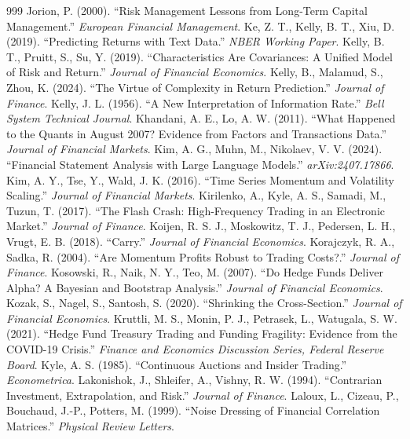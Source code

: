 \begin{thebibliography}{999}
 Jorion, P. (2000). ``Risk Management Lessons from Long-Term Capital Management.'' \textit{European Financial Management}.
 Ke, Z. T., Kelly, B. T., Xiu, D. (2019). ``Predicting Returns with Text Data.'' \textit{NBER Working Paper}.
 Kelly, B. T., Pruitt, S., Su, Y. (2019). ``Characteristics Are Covariances: A Unified Model of Risk and Return.'' \textit{Journal of Financial Economics}.
 Kelly, B., Malamud, S., Zhou, K. (2024). ``The Virtue of Complexity in Return Prediction.'' \textit{Journal of Finance}.
 Kelly, J. L. (1956). ``A New Interpretation of Information Rate.'' \textit{Bell System Technical Journal}.
 Khandani, A. E., Lo, A. W. (2011). ``What Happened to the Quants in August 2007? Evidence from Factors and Transactions Data.'' \textit{Journal of Financial Markets}.
 Kim, A. G., Muhn, M., Nikolaev, V. V. (2024). ``Financial Statement Analysis with Large Language Models.'' \textit{arXiv:2407.17866}.
 Kim, A. Y., Tse, Y., Wald, J. K. (2016). ``Time Series Momentum and Volatility Scaling.'' \textit{Journal of Financial Markets}.
 Kirilenko, A., Kyle, A. S., Samadi, M., Tuzun, T. (2017). ``The Flash Crash: High-Frequency Trading in an Electronic Market.'' \textit{Journal of Finance}.
 Koijen, R. S. J., Moskowitz, T. J., Pedersen, L. H., Vrugt, E. B. (2018). ``Carry.'' \textit{Journal of Financial Economics}.
 Korajczyk, R. A., Sadka, R. (2004). ``Are Momentum Profits Robust to Trading Costs?.'' \textit{Journal of Finance}.
 Kosowski, R., Naik, N. Y., Teo, M. (2007). ``Do Hedge Funds Deliver Alpha? A Bayesian and Bootstrap Analysis.'' \textit{Journal of Financial Economics}.
 Kozak, S., Nagel, S., Santosh, S. (2020). ``Shrinking the Cross-Section.'' \textit{Journal of Financial Economics}.
 Kruttli, M. S., Monin, P. J., Petrasek, L., Watugala, S. W. (2021). ``Hedge Fund Treasury Trading and Funding Fragility: Evidence from the COVID-19 Crisis.'' \textit{Finance and Economics Discussion Series, Federal Reserve Board}.
 Kyle, A. S. (1985). ``Continuous Auctions and Insider Trading.'' \textit{Econometrica}.
 Lakonishok, J., Shleifer, A., Vishny, R. W. (1994). ``Contrarian Investment, Extrapolation, and Risk.'' \textit{Journal of Finance}.
 Laloux, L., Cizeau, P., Bouchaud, J.-P., Potters, M. (1999). ``Noise Dressing of Financial Correlation Matrices.'' \textit{Physical Review Letters}.

\end{thebibliography}
